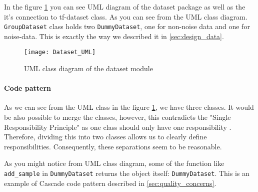 In the figure \ref{fig:dataset_uml} you can see UML diagram of the dataset package
as well as the it's connection to tf-dataset class. As you can see from the UML
class diagram.
\lstinline{GroupDataset} class holds two \lstinline{DummyDataset}, one for
non-noise data and one for noise-data. This is exactly the way
we described it in \autoref{sec:design_data}.
\begin{figure}
	\texttt{[image: Dataset\_UML]}
	\caption{UML class diagram of the dataset module}
	\label{fig:dataset_uml}
\end{figure}

\paragraph{Code pattern} As we can see from the UML class in the figure
\ref{fig:dataset_uml}, we have three classes. It would be also possible
to merge the classes, however, this contradicts the "Single Responsibility Principle"
as one class should only have one responsibility \cite{martin2003agile}.
Therefore, dividing this into two classes allows us to clearly
define responsibilities. Consequently, these separations seem to be reasonable.

As you might notice from UML class diagram, some of the function like
\lstinline{add_sample} in \lstinline{DummyDataset} returns the object itself: \lstinline{DummyDataset}.
This is an example of Cascade code pattern described in \autoref{sec:quality_concerns}.

%

%
%
%
%
%

%

